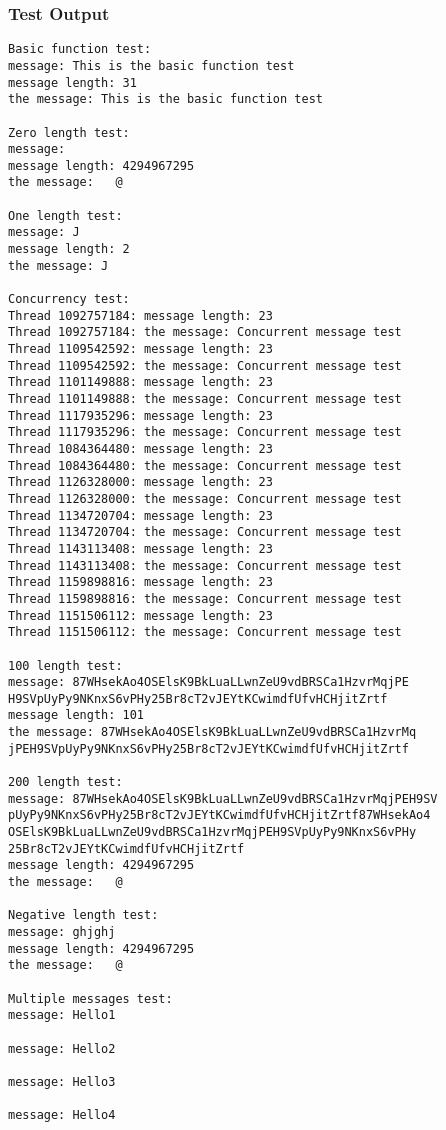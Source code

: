 \documentclass[12pt,a4paper]{report}
\begin{document}
\subsubsection{Test Output}
\begin{verbatim}
Basic function test:
message: This is the basic function test
message length: 31
the message: This is the basic function test

Zero length test:
message: 
message length: 4294967295
the message:   @

One length test:
message: J
message length: 2
the message: J

Concurrency test:
Thread 1092757184: message length: 23
Thread 1092757184: the message: Concurrent message test
Thread 1109542592: message length: 23
Thread 1109542592: the message: Concurrent message test
Thread 1101149888: message length: 23
Thread 1101149888: the message: Concurrent message test
Thread 1117935296: message length: 23
Thread 1117935296: the message: Concurrent message test
Thread 1084364480: message length: 23
Thread 1084364480: the message: Concurrent message test
Thread 1126328000: message length: 23
Thread 1126328000: the message: Concurrent message test
Thread 1134720704: message length: 23
Thread 1134720704: the message: Concurrent message test
Thread 1143113408: message length: 23
Thread 1143113408: the message: Concurrent message test
Thread 1159898816: message length: 23
Thread 1159898816: the message: Concurrent message test
Thread 1151506112: message length: 23
Thread 1151506112: the message: Concurrent message test

100 length test:
message: 87WHsekAo4OSElsK9BkLuaLLwnZeU9vdBRSCa1HzvrMqjPE
H9SVpUyPy9NKnxS6vPHy25Br8cT2vJEYtKCwimdfUfvHCHjitZrtf
message length: 101
the message: 87WHsekAo4OSElsK9BkLuaLLwnZeU9vdBRSCa1HzvrMq
jPEH9SVpUyPy9NKnxS6vPHy25Br8cT2vJEYtKCwimdfUfvHCHjitZrtf

200 length test:
message: 87WHsekAo4OSElsK9BkLuaLLwnZeU9vdBRSCa1HzvrMqjPEH9SV
pUyPy9NKnxS6vPHy25Br8cT2vJEYtKCwimdfUfvHCHjitZrtf87WHsekAo4
OSElsK9BkLuaLLwnZeU9vdBRSCa1HzvrMqjPEH9SVpUyPy9NKnxS6vPHy
25Br8cT2vJEYtKCwimdfUfvHCHjitZrtf
message length: 4294967295
the message:   @

Negative length test:
message: ghjghj
message length: 4294967295
the message:   @

Multiple messages test:
message: Hello1

message: Hello2

message: Hello3

message: Hello4


\end{verbatim}
\end{document}
